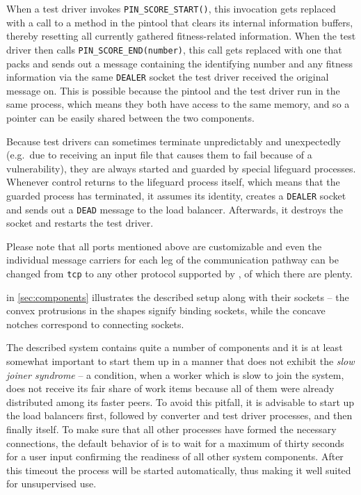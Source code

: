 When a test driver invokes \texttt{PIN\_SCORE\_START()}, this invocation gets replaced with a call to a method
in the pintool that clears its internal information buffers, thereby resetting all currently gathered
fitness-related information. When the test driver then calls \texttt{PIN\_SCORE\_END(number)}, this call gets
replaced with one that packs and sends out a message containing the identifying number and any fitness
information via the same \zmq \texttt{DEALER} socket the test driver received the original message on. This is
possible because the pintool and the test driver run in the same process, which means they both have access to
the same memory, and so a pointer can be easily shared between the two components.

Because test drivers can sometimes terminate unpredictably and unexpectedly (e.g.\ due to receiving an input
file that causes them to fail because of a vulnerability), they are always started and guarded by special
lifeguard processes. Whenever control returns to the lifeguard process itself, which means that the guarded
process has terminated, it assumes its identity, creates a \texttt{DEALER} socket and sends out a \texttt{DEAD}
message to the load balancer. Afterwards, it destroys the socket and restarts the test driver.

Please note that all ports mentioned above are customizable and even the individual message carriers for
each leg of the communication pathway can be changed from \texttt{tcp} to any other protocol supported by \zmq,
of which there are plenty.

 in \cref{sec:components} illustrates the described setup along with their 
\zmq sockets -- the convex protrusions in the shapes signify binding sockets, while the concave notches
correspond to connecting sockets.

The described system contains quite a number of components and it is at least somewhat important to start them
up in a manner that does not exhibit the \emph{slow joiner syndrome} -- a condition, when a worker which is
slow to join the system, does not receive its fair share of work items because all of them were already distributed
among its faster peers. To avoid this pitfall, it is advisable to start up the load balancers first, followed
by converter and test driver processes, and then finally \xmlmate itself. To make sure that all other
processes have formed the necessary connections, the default behavior of \xmlmate is to wait for a maximum of
thirty seconds for a user input confirming the readiness of all other system components. After this timeout the
process will be started automatically, thus making it well suited for unsupervised use.

